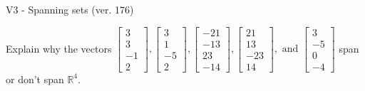 \begin{exercise}
  \begin{exerciseTitle}V3 - Spanning sets (ver. 176)\end{exerciseTitle}
  \begin{exerciseStatement}
    Explain why the vectors \(\left[\begin{array}{r}
3 \\
3 \\
-1 \\
2
\end{array}\right] , \left[\begin{array}{r}
3 \\
1 \\
-5 \\
2
\end{array}\right] , \left[\begin{array}{r}
-21 \\
-13 \\
23 \\
-14
\end{array}\right] , \left[\begin{array}{r}
21 \\
13 \\
-23 \\
14
\end{array}\right] , \text{ and } \left[\begin{array}{r}
3 \\
-5 \\
0 \\
-4
\end{array}\right]\) span or don't span \(\mathbb{R}^4\). 
	



\end{exerciseStatement}
\end{exercise}
